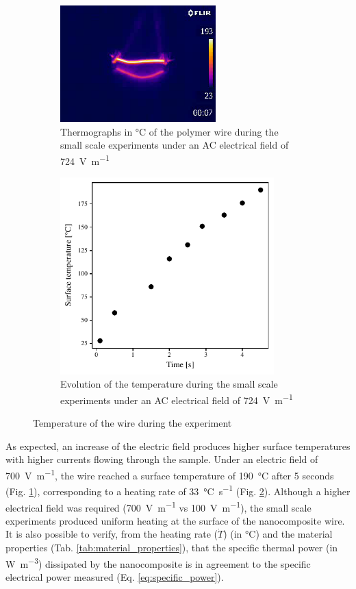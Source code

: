 \documentclass[11pt,review,times]{elsarticle}
\begin{document}
\begin{figure}[htb]
	\center
	\captionsetup{width=125mm}
	\begin{subfigure}{60mm}
		\center
		\captionsetup{width=60mm}
		\includegraphics[width=60mm]{output0036}
		\caption{Thermographs in \si{\celsius} of the polymer wire during the small scale experiments under an AC electrical field of \SI{724}{\volt\per\metre}}
		\label{fig:results_thermal}
	\end{subfigure}
	\begin{subfigure}{80mm}
		\center
		\captionsetup{width=78mm}
		\includegraphics[width=3.25in]{temperature_over_time.pdf}
		\caption{Evolution of the temperature during the small scale experiments under an AC electrical field of \SI{724}{\volt\per\metre}}
		\label{fig:temp_over_time}
	\end{subfigure}%
	\caption{Temperature of the wire during the experiment}
	\label{fig:results_lab}
\end{figure}

As expected, an increase of the electric field produces higher surface temperatures with higher currents flowing through the sample. 
Under an electric field of \SI{700}{\volt\per\metre}, the wire reached a surface temperature of \SI{190}{\celsius} after 5 seconds (Fig. \ref{fig:results_thermal}), corresponding to a heating rate of \SI{33}{\celsius\per\second} (Fig. \ref{fig:temp_over_time}). 
Although a higher electrical field was required (\SI{700}{\volt\per\metre} vs \SI{100}{\volt\per\metre}), the small scale experiments produced uniform heating at the surface of the nanocomposite wire. 
It is also possible to verify, from the heating rate ($\dot{T}$) (in \si{\celsius}) and the material properties (Tab. \ref{tab:material_properties}), that the specific thermal power (in \si{\watt\per\cubic\metre}) dissipated by the nanocomposite is in agreement to the specific electrical power measured (Eq. \ref{eq:specific_power}). 
\end{document}
